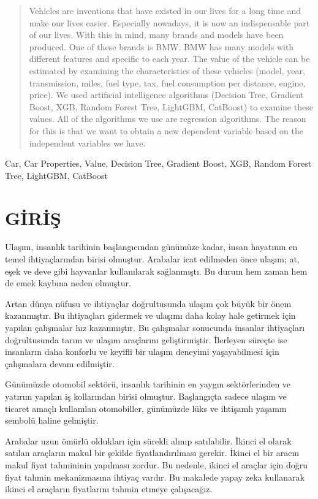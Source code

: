 \documentclass[conference]{IEEEtran}
\begin{document}
\begin{abstract}
Vehicles are inventions that have existed in our lives for a long time and make our lives easier. Especially nowadays, it is now an indispensable part of our lives. With this in mind, many brands and models have been produced. One of these brands is BMW. BMW has many models with different features and specific to each year. The value of the vehicle can be estimated by examining the characteristics of these vehicles (model, year, transmission, miles, fuel type, tax, fuel consumption per distance, engine, price). We used artificial intelligence algorithms (Decision Tree, Gradient Boost, XGB, Random Forest Tree, LightGBM, CatBoost) to examine these values. All of the algorithms we use are regression algorithms. The reason for this is that we want to obtain a new dependent variable based on the independent variables we have.
\end{abstract}

\begin{IEEEkeywords}
Car, Car Properties, Value, Decision Tree, Gradient Boost, XGB, Random Forest Tree, LightGBM, CatBoost
\end{IEEEkeywords}

\section{\textbf{GİRİŞ}}
\quad Ulaşım, insanlık tarihinin başlangıcından günümüze kadar, insan hayatının en temel ihtiyaçlarından birisi olmuştur. Arabalar icat edilmeden önce ulaşım; at, eşek ve deve gibi hayvanlar kullanılarak sağlanmıştı. Bu durum hem zaman hem de emek kaybına neden olmuştur.

\quad Artan dünya nüfusu ve ihtiyaçlar doğrultusunda ulaşım çok büyük bir önem kazanmıştır. Bu ihtiyaçları gidermek ve ulaşımı daha kolay hale getirmek için yapılan çalışmalar hız kazanmıştır. Bu çalışmalar sonucunda insanlar ihtiyaçları doğrultusunda tarım ve ulaşım araçlarını geliştirmiştir. İlerleyen süreçte ise insanların daha konforlu ve keyifli bir ulaşım deneyimi yaşayabilmesi için çalışmalara devam edilmiştir.

\quad Günümüzde otomobil sektörü, insanlık tarihinin en yaygın sektörlerinden ve yatırım yapılan iş kollarından  birisi olmuştur. Başlangıçta sadece ulaşım ve ticaret amaçlı kullanılan otomobiller, günümüzde lüks ve ihtişamlı yaşamın sembolü haline gelmiştir\cite{1}.

\quad Arabalar uzun ömürlü oldukları için sürekli alınıp satılabilir. İkinci el olarak satılan araçların makul bir şekilde fiyatlandırılması gerekir. İkinci el bir aracın makul fiyat tahmininin yapılması zordur. Bu nedenle, ikinci el araçlar için doğru fiyat tahmin mekanizmasına ihtiyaç vardır\cite{2}. Bu makalede yapay zeka kullanarak ikinci el araçların fiyatlarını tahmin etmeye çalışacağız.
\end{document}
